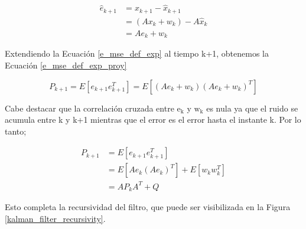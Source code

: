 \documentclass[10pt, a4paper]{report}
\begin{document}
\begin{align}
    \hat{e}_{k+1} &= x_{k+1} - \hat{x}_{k+1} \nonumber \\
                  &= \left(Ax_k + w_k\right) - A\hat{x}_k \nonumber \\
                  &= Ae_k + w_k \label{prior_err_exp}
\end{align}

Extendiendo la Ecuaci\'on \ref{e_mse_def_exp} al tiempo k+1, obtenemos la
Ecuaci\'on \ref{e_mse_def_exp_proy}

\begin{equation}
    P_{k+1} = E\left[e_{k+1}e_{k+1}^T\right] = E\left[\left(Ae_k +
    w_k\right)\left(Ae_k + w_k\right)^T\right]\label{e_mse_def_exp_proy}
\end{equation}

Cabe destacar que la correlaci\'on cruzada entre $\mathrm{e_k}$ y $\mathrm{w_k}$ 
es nula ya que el ruido se acumula entre k y k+1 mientras que el error es el
error hasta el instante k. Por lo tanto;

\begin{align}
    P_{k+1} &= E\left[e_{k+1}e_{k+1}^T\right]\nonumber\\
            &= E\left[Ae_k\left(Ae_k\right)^T\right] +
            E\left[w_kw_k^T\right]\nonumber\\
            &= AP_kA^T + Q \label{proy_cov}
\end{align}

Esto completa la recursividad del filtro, que puede ser visibilizada en la
Figura \ref{kalman_filter_recursivity}. 
\end{document}
